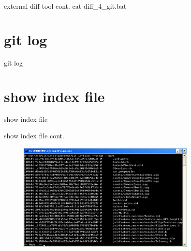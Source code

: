 ﻿\documentclass{beamer}
\begin{document}
\begin{frame}{external diff tool cont.}
  \textcolor{blue!50}{\ttfamily cat diff\_4\_git.bat}
  
\end{frame}


\section[git log]{git log}
\begin{frame}{git log}
\end{frame}


\section[show index file]{show index file}
\begin{frame}{show index file}
\end{frame}

\begin{frame}{show index file cont.}
\begin{figure}
  \centering
  \includegraphics[width=0.8\textwidth]{picturedir/showindex.png}%
\end{figure}
\end{frame}
\end{document}
